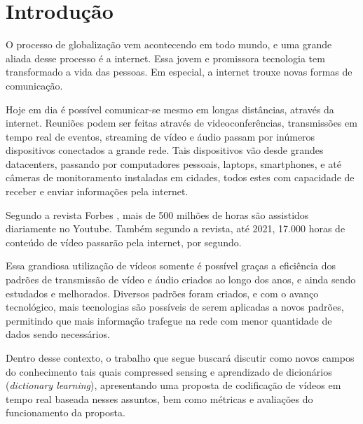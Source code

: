 \documentclass[cic,tc]{iiufrgs}
\begin{document}

\tableofcontents


\chapter{Introdução}
O processo de globalização vem acontecendo em todo mundo, 
e uma grande aliada desse processo é a internet.
Essa jovem e promissora tecnologia tem transformado a vida das pessoas.
Em especial, a internet trouxe novas formas de comunicação.

Hoje em dia é possível comunicar-se mesmo em longas distâncias, 
através da internet.
Reuniões podem ser feitas através de videoconferências, transmissões 
em tempo real de eventos, streaming de vídeo e áudio passam por 
inúmeros dispositivos conectados a grande rede.
Tais dispositivos vão desde grandes datacenters, passando por computadores 
pessoais, laptops, smartphones, e até câmeras de monitoramento instaladas
em cidades, todos estes com capacidade de receber e enviar informações 
pela internet.

Segundo a revista Forbes \cite{VideoMarketing}, mais de 500 milhões de horas são assistidos 
diariamente no Youtube. 
Também segundo a revista, até 2021, 17.000 horas de conteúdo de vídeo passarão 
pela internet, por segundo.

Essa grandiosa utilização de vídeos somente é possível graças a eficiência 
dos padrões de transmissão de vídeo e áudio criados ao longo dos anos, 
e ainda sendo estudados e melhorados.
Diversos padrões foram criados, e com o avanço tecnológico, mais tecnologias
são possíveis de serem aplicadas a novos padrões, permitindo que mais informação
trafegue na rede com menor quantidade de dados sendo necessários.

Dentro desse contexto, o trabalho que segue buscará discutir como novos 
campos do conhecimento tais quais compressed sensing e aprendizado de 
dicionários (\emph{dictionary learning}), apresentando uma proposta de 
codificação de vídeos em tempo real baseada nesses assuntos, bem como 
métricas e avaliações do funcionamento da proposta.
\end{document}
